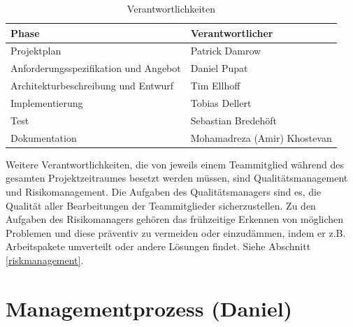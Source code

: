 \documentclass[fontsize=12pt,paper=a4,twoside]{scrartcl}
\begin{document}
\begin{table}[htbp]
\caption{Verantwortlichkeiten}
\label{tab:respons}
\centering
\begin{tabular}{p{}|p{}}
\hline Phase & Verantwortlicher \\ \hline
\hline Projektplan & Patrick Damrow\\
\hline Anforderungsspezifikation und Angebot & Daniel Pupat\\
\hline Architekturbeschreibung und Entwurf & Tim Ellhoff\\
\hline Implementierung & Tobias Dellert\\
\hline Test & Sebastian Bredehöft\\
\hline Dokumentation & Mohamadreza (Amir) Khostevan\\
\hline 
\end{tabular}
\end{table}

Weitere Verantwortlichkeiten, die von jeweils einem Teammitglied während des gesamten Projektzeitraumes besetzt werden müssen, sind Qualitätsmanagement und Risikomanagement.
Die Aufgaben des Qualitätsmanagers sind es, die Qualität aller Bearbeitungen der Teammitglieder sicherzustellen.
Zu den Aufgaben des Risikomanagers gehören das frühzeitige Erkennen von möglichen Problemen und diese präventiv zu vermeiden oder einzudämmen, indem er z.B. Arbeitspakete umverteilt oder andere Lösungen findet. Siehe Abschnitt \ref{riskmanagement}.


\section{Managementprozess (Daniel)}
\end{document}
